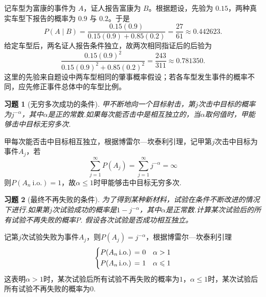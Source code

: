 \documentclass[UTF8,12pt,a4paper,fontset=fandol]{ctexart}
\newtheorem{exercise}{习题}[section]
\begin{document}
\begin{solve}\label{a:Y2.25}记车型为富康的事件为 $A$，证人报告富康为 $B$。根据题设，先验为 $0.15$，两种真实车型下报告的概率为 $0.9$ 与 $0.2$。于是\[P(A\mid B)=\frac{0.15(0.9)}{0.15(0.9)+0.85(0.2)}=\frac{27}{61}\approx0.442623.\]给定车型后，两名证人报告条件独立，故两次相同指证后的后验为\[\frac{0.15(0.9)^2}{0.15(0.9)^2+0.85(0.2)^2}=\frac{243}{311}\approx0.781350.\]这里的先验来自题设中两车型相同的肇事概率假设；若各车型发生事件的概率不同，应先修正事件总体中的车型比例。\end{solve}

\begin{exercise}[无穷多次成功的条件]\label{q:Y2.26}
甲不断地向一个目标射击，第$j$次击中目标的概率为$j^{-\alpha}$，其中$\alpha$是正的常数.如果每次能否击中是相互独立的，当$\alpha$取何值时，甲能够击中目标无穷多次.\par{}
\end{exercise}

\begin{solve}\label{a:Y2.26}
甲每次能否击中目标相互独立，根据博雷尔—坎泰利引理，记甲第$j$次击中目标为事件$A_j$，若
\[\sum\limits_{j = 1}^\infty  {P({A_j})}  = \sum\limits_{j = 1}^\infty  {{j^{ - \alpha }}}  = \infty \]
则$P(A_n\: \text{i.o.})=1$，故$\alpha\leqslant 1$时甲能够击中目标无穷多次.
\end{solve}

\begin{exercise}[最终不再失败的条件]\label{q:Y2.27}
为了得到某种新材料，试验在条件不断改进的情况下进行.如果第$j$次试验成功的概率是$1-j^{-\alpha}$，其中$\alpha$是正常数.计算某次试验后的所有试验不再失败的概率$P$. 假设各次试验是否成功相互独立。\par{}
\end{exercise}

\begin{solve}\label{a:Y2.27}
记第$j$次试验失败为事件$A_j$，则$P(A_j)=j^{-\alpha}$，根据博雷尔—坎泰利引理
\[\left\{ \begin{gathered}
  P({A_n}\,{\text{i}}.{\text{o}}{\text{.) = 0}} \hfill \quad \alpha>1 \\
  P({A_n}\,{\text{i}}.{\text{o}}{\text{.) = 1}} \hfill \quad \alpha\leqslant 1\\ 
\end{gathered}  \right.\]
这表明$\alpha>1$时，某次试验后所有试验不再失败的概率为$1$，$\alpha\leqslant 1$时，某次试验后所有试验不再失败的概率为$0$.
\end{solve}
\end{document}

